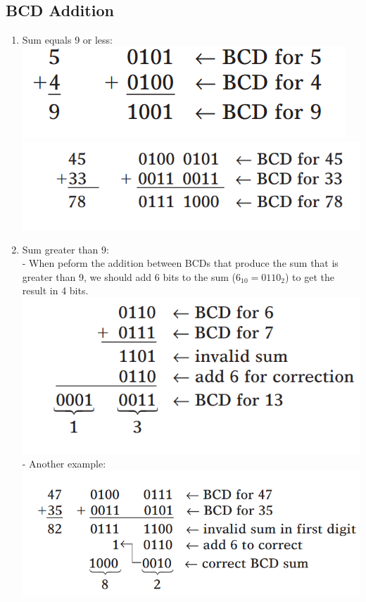\documentclass[12pt]{article}
\begin{document}
\subsection{BCD Addition}
\begin{enumerate}
	\item Sum equals 9 or less: \\
\includegraphics[scale = 0.6]{hinh32}
\bigbreak
\includegraphics[scale = 0.6]{hinh33.png}
	\item Sum greater than 9: \\
	- When peform the addition between BCDs that produce the sum that is greater than 9, we should add 6 bits to the sum ($6_{10} = 0110_{2}$) to get the result in 4 bits. \\
	\includegraphics[scale = 0.6]{hinh34}
	\bigbreak
	- Another example: \\
	\includegraphics[scale = 0.6]{hinh35}
\end{enumerate}
\end{document}
